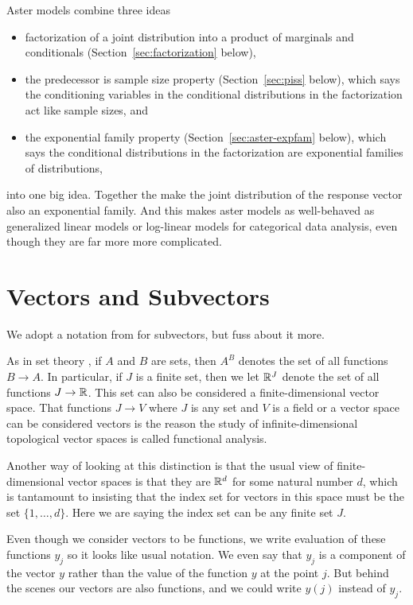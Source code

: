 Aster models combine three ideas
\begin{itemize}
\item factorization of a joint distribution into a product of marginals
    and conditionals (Section~\ref{sec:factorization} below),
\item the predecessor is sample size property (Section~\ref{sec:piss} below),
    which says the conditioning variables in the conditional distributions
    in the factorization act like sample sizes, and
\item the exponential family property (Section~\ref{sec:aster-expfam} below),
    which says the conditional distributions in the factorization are
    exponential families of distributions,
\end{itemize}
into one big idea.  Together the make the joint distribution of the
response vector also an exponential family.  And this makes aster models
as well-behaved as generalized linear models or log-linear models for
categorical data analysis, even though they are far more more complicated.

\section{Vectors and Subvectors}
\label{sec:subvector}

We adopt a notation from \citet{lauritzen} for subvectors, but fuss about it
more.

As in set theory \citep[Section~8]{halmos-set-theory}, if $A$ and $B$
are sets, then $A^B$ denotes the set of all functions $B \to A$.
In particular, if $J$ is a finite set, then we let $\mathbb{R}^J$ denote
the set of all functions $J \to \mathbb{R}$.  This set can also be considered
a finite-dimensional vector space.  That functions $J \to V$ where $J$ is
any set and $V$ is a field or a vector space can be considered
vectors is the reason the study of infinite-dimensional topological vector
spaces is called functional analysis.

Another way of looking at this distinction is that the usual view of
finite-dimensional vector spaces is that they are $\mathbb{R}^d$ for some
natural number $d$, which is tantamount to insisting that the index
set for vectors in this space must be the set $\{1, \ldots, d\}$.
Here we are saying the index set can be any finite set $J$.

Even though we consider vectors to be functions, we write evaluation
of these functions $y_j$ so it looks like usual notation.  We even say
that $y_j$ is a component of the vector $y$ rather than the value of
the function $y$ at the point $j$.  But behind the scenes our vectors
are also functions, and we could write $y(j)$ instead of $y_j$.

